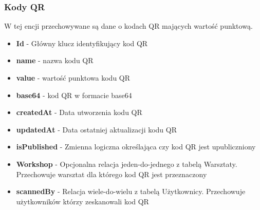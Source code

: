 \subsubsection{Kody QR}
\noindent W tej encji przechowywane są dane o kodach QR mających wartość punktową.
\begin{itemize}
    \item \textbf{Id} - Główny klucz identyfikujący kod QR
    \item \textbf{name} - nazwa kodu QR
    \item  \textbf{value} - wartość punktowa kodu QR
    \item  \textbf{base64} - kod QR w formacie base64
    \item \textbf{createdAt} - Data utworzenia kodu QR
    \item \textbf{updatedAt} - Data ostatniej aktualizacji kodu QR
    \item \textbf{isPublished} - Zmienna logiczna określająca czy kod QR jest upubliczniony
    \item \textbf{Workshop} - Opcjonalna relacja jeden-do-jednego z tabelą Warsztaty. Przechowuje warsztat dla którego kod QR jest przeznaczony
    \item \textbf{scannedBy} - Relacja wiele-do-wielu z tabelą Użytkownicy. Przechowuje użytkowników którzy zeskanowali kod QR
    \end{itemize}